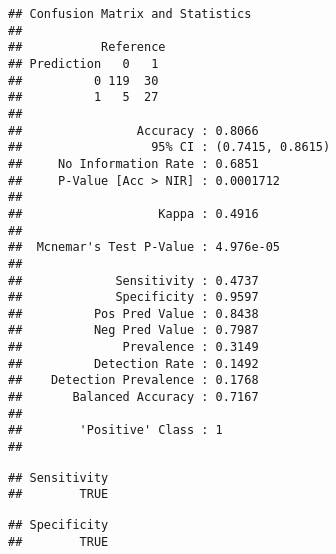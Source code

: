 \documentclass[
]{article}
\newenvironment{Shaded}{\begin{snugshade}}{\end{snugshade}}
\newcommand{\NormalTok}[1]{#1}
\newcommand{\OperatorTok}[1]{\textcolor[rgb]{0.81,0.36,0.00}{\textbf{#1}}}
\newcommand{\StringTok}[1]{\textcolor[rgb]{0.31,0.60,0.02}{#1}}
\begin{document}
\begin{verbatim}
## Confusion Matrix and Statistics
## 
##           Reference
## Prediction   0   1
##          0 119  30
##          1   5  27
##                                           
##                Accuracy : 0.8066          
##                  95% CI : (0.7415, 0.8615)
##     No Information Rate : 0.6851          
##     P-Value [Acc > NIR] : 0.0001712       
##                                           
##                   Kappa : 0.4916          
##                                           
##  Mcnemar's Test P-Value : 4.976e-05       
##                                           
##             Sensitivity : 0.4737          
##             Specificity : 0.9597          
##          Pos Pred Value : 0.8438          
##          Neg Pred Value : 0.7987          
##              Prevalence : 0.3149          
##          Detection Rate : 0.1492          
##    Detection Prevalence : 0.1768          
##       Balanced Accuracy : 0.7167          
##                                           
##        'Positive' Class : 1               
## 
\end{verbatim}

\begin{Shaded}
\end{Shaded}

\begin{verbatim}
## Sensitivity 
##        TRUE
\end{verbatim}

\begin{Shaded}
\end{Shaded}

\begin{verbatim}
## Specificity 
##        TRUE
\end{verbatim}

\begin{Shaded}
\end{Shaded}
\end{document}
